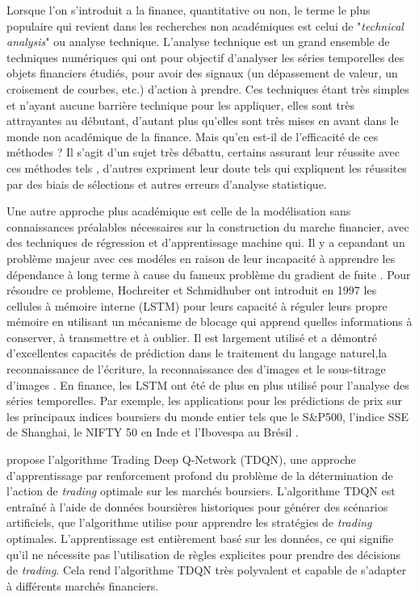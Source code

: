 \documentclass[twocolumn]{article}
\begin{document}
Lorsque l'on s'introduit a la finance, quantitative ou non, le terme le plus populaire qui revient dans les recherches non académiques est celui de "\textit{technical analysis}" ou analyse technique. L'analyse technique est un grand ensemble de techniques numériques qui ont pour objectif d'analyser les séries temporelles des objets financiers étudiés, pour avoir des signaux (un dépassement de valeur, un croisement de courbes, etc.) d'action \`a prendre. Ces techniques étant très simples et n'ayant aucune barrière technique pour les appliquer, elles sont très attrayantes au débutant, d'autant plus qu'elles sont très mises en avant dans le monde non académique de la finance. Mais qu'en est-il de l'efficacité de ces méthodes ? Il s'agit d'un sujet très débattu, certains assurant leur réussite avec ces méthodes tels \cite{hsu_technical_2016}, d'autres expriment leur doute tels \cite{marshall_can_2008} qui expliquent les réussites par des biais de sélections et autres erreurs d'analyse statistique.
\newline

Une autre approche plus académique est celle de la modélisation sans connaissances préalables nécessaires sur la construction du marche financier, avec des techniques de régression et d'apprentissage machine qui. Il y a cepandant un probl\`eme majeur avec ces mod\'eles en raison de leur incapacit\'e \`a apprendre les d\'ependance \`a long terme \`a cause du fameux problème du gradient de fuite \cite{bao_deep_2017}. Pour r\'esoudre ce probleme, Hochreiter et Schmidhuber ont introduit en 1997 les cellules \`a m\'emoire interne (LSTM) \cite{gers_learning_2000} pour leurs capacit\'e \`a r\'eguler leurs propre m\'emoire en utilisant un m\'ecanisme de blocage qui apprend quelles informations à conserver, à transmettre et à oublier. Il est largement utilisé et a démontré d'excellentes capacités de prédiction dans le traitement du langage naturel,la reconnaissance de l'écriture, la reconnaissance des d'images et le sous-titrage d'images \cite{byeon_scene_2015}. En finance, les LSTM ont \'et\'e de plus en plus utilis\'e  pour l'analyse des s\'eries temporelles. Par exemple, les applications pour les pr\'edictions de prix sur les principaux indices boursiers du monde entier tels que le S&P500, l'indice SSE de Shanghai, le NIFTY 50 en Inde et l'Ibovespa au Brésil \cite{bao_deep_2017}.
\newline

\cite{theate_application_2021} propose l'algorithme Trading Deep Q-Network (TDQN), une approche d'apprentissage par renforcement profond du problème de la détermination de l'action de \textit{trading} optimale sur les marchés boursiers. L'algorithme TDQN est entraîné à l'aide de données boursières historiques pour générer des scénarios artificiels, que l'algorithme utilise pour apprendre les stratégies de \textit{trading} optimales. L'apprentissage est entièrement basé sur les données, ce qui signifie qu'il ne nécessite pas l'utilisation de règles explicites pour prendre des décisions de \textit{trading}. Cela rend l'algorithme TDQN très polyvalent et capable de s'adapter à différents marchés financiers.
\newline
\end{document}
